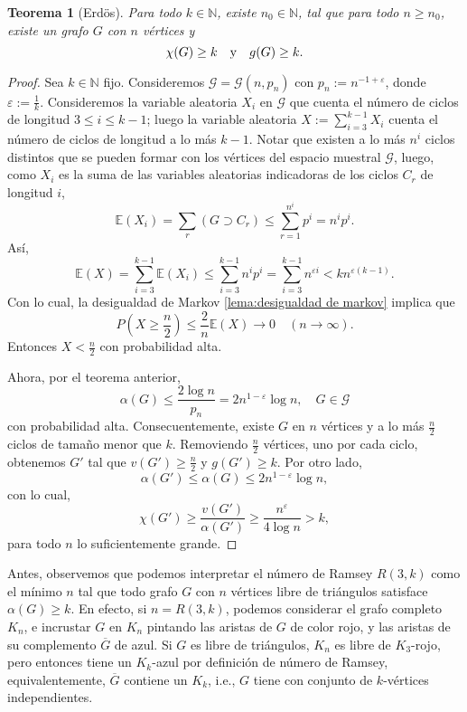 \documentclass[12pt]{report}
\theoremstyle{plain}
\newtheorem{theorem}{Teorema}[section]
\theoremstyle{definition}
\newcommand{\naturals}{\mathbb{N}}
\renewcommand{\bar}[1]{\overline{#1}}
\begin{document}
\begin{theorem}[Erdös]
Para todo $k \in \naturals$, existe $n_0 \in \naturals$, tal que para todo $n \geq n_0$, existe un grafo $G$ con $n$ vértices y
\[
    \chi (G) \geq k \quad \text y \quad g(G) \geq k.
\]
\end{theorem}
\begin{proof}
Sea $k \in \naturals$ fijo. Consideremos $\mathcal G = \mathcal G (n, p_n)$ con $p_n := n^{-1 + \varepsilon}$, donde $\varepsilon := \frac 1 k$. Consideremos la variable aleatoria $X_i$ en $\mathcal G$ que cuenta el número de ciclos de longitud $3 \leq i \leq k-1$; luego la variable aleatoria $X := \sum_{i=3}^{k-1} X_i$ cuenta el número de ciclos de longitud a lo más $k -1$. Notar que existen a lo más $n^i$ ciclos distintos que se pueden formar con los vértices del espacio muestral $\mathcal G$, luego, como $X_i$ es la suma de las variables aleatorias indicadoras de los ciclos $C_r$ de longitud $i$,
\[
    \mathbb{E}(X_i) = \sum_r ( G \supset C_r) \leq \sum_{r=1 }^{n^i}p^i = n^i p^i.
\]
Así,
\[
    \mathbb{E} (X)  = \sum_{i = 3}^{k-1} \mathbb{E} (X_i) \leq \sum_{i = 3}^{k-1} n^i p^i = \sum_{i = 3}^{k-1} n^{\varepsilon i} < k n^{\varepsilon(k-1)}.
\]
Con lo cual, la desigualdad de Markov \ref{lema:desigualdad de markov} implica que
\[
    P(X \geq \frac n 2) \leq \frac 2 n \mathbb{E}(X) \longrightarrow 0 \quad (n \to \infty).
\]
Entonces $X < \frac n 2$ con probabilidad alta.

Ahora, por el teorema anterior,
\[
    \alpha (G) \leq \frac{2 \log n} {p_n} = 2 n^{1-\varepsilon} \log n , \quad G \in \mathcal G
\]
con probabilidad alta. Consecuentemente, existe $G$ en $n$ vértices y a lo más $\frac n 2$ ciclos de tamaño menor que $k$. Removiendo $\frac n 2$ vértices, uno por cada ciclo, obtenemos $G'$ tal que $v(G') \geq \frac n 2$ y $g (G') \geq k$. Por otro lado,
\[
    \alpha (G') \leq \alpha (G) \leq 2 n^{1-\varepsilon} \log n,
\]
con lo cual,
\[
    \chi (G') \geq \frac{v(G')}{\alpha (G')} \geq \frac{n^{\varepsilon}}{4 \log n} > k,
\]
para todo $n$ lo suficientemente grande.
\end{proof}


\bigskip


Antes, observemos que podemos interpretar el número de Ramsey $R(3, k)$ como el mínimo $n$ tal que todo grafo $G$ con $n$ vértices libre de triángulos satisface $\alpha (G) \geq k$. En efecto, si $n = R (3,k)$, podemos considerar el grafo completo $K_n$, e incrustar $G$ en $K_n$ pintando las aristas de $G$ de color rojo, y las aristas de su complemento $\bar G$ de azul. Si $G$ es libre de triángulos, $K_n$ es libre de $K_3$-rojo, pero entonces tiene un $K_k$-azul por definición de número de Ramsey, equivalentemente, $\bar G$ contiene un $K_k$, i.e., $G$ tiene con conjunto de $k$-vértices independientes.
\end{document}
